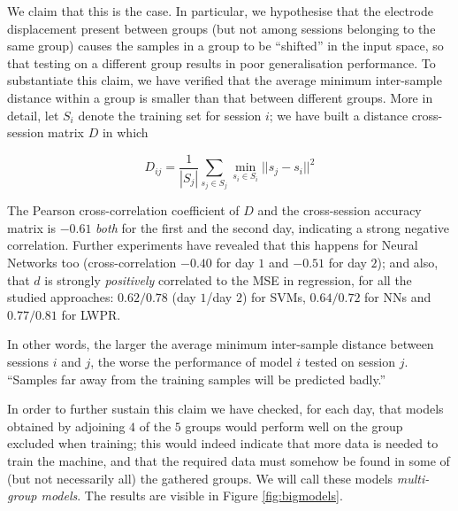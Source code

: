 We claim that this is the case. In particular, we hypothesise that the
electrode displacement present between groups (but not among sessions
belonging to the same group) causes the samples in a group to be
``shifted'' in the input space, so that testing on a different group
results in poor generalisation performance. To substantiate this
claim, we have verified that the average minimum inter-sample distance
within a group is smaller than that between different groups. More in
detail, let $S_i$ denote the training set for session $i$; we have
built a distance cross-session matrix $D$ in which

$$ D_{ij} = \frac{1}{|S_j|} \sum_{s_j \in S_j}{\min_{s_i \in S_i}{ ||s_j-s_i||^2 } } $$

The Pearson cross-correlation coefficient of $D$ and the cross-session
accuracy matrix is $-0.61$ \emph{both} for the first and the second
day, indicating a strong negative correlation. Further experiments
have revealed that this happens for Neural Networks too
(cross-correlation $-0.40$ for day $1$ and $-0.51$ for day $2$); and
also, that $d$ is strongly \emph{positively} correlated to the MSE in
regression, for all the studied approaches: $0.62/0.78$ (day $1$/day
$2$) for SVMs, $0.64/0.72$ for NNs and $0.77/0.81$ for LWPR.

In other words, the larger the average minimum inter-sample distance
between sessions $i$ and $j$, the worse the performance of model $i$
tested on session $j$. ``Samples far away from the training samples will
be predicted badly.''

In order to further sustain this claim we have checked, for each day,
that models obtained by adjoining $4$ of the $5$ groups would perform
well on the group excluded when training; this would indeed indicate
that more data is needed to train the machine, and that the required
data must somehow be found in some of (but not necessarily all) the
gathered groups. We will call these models \emph{multi-group
models}. The results are visible in Figure \ref{fig:bigmodels}.

